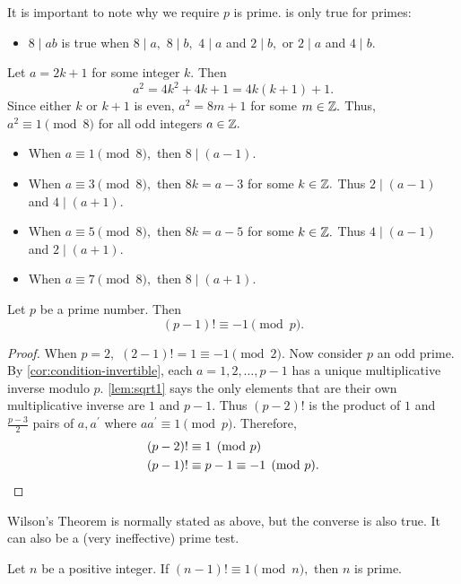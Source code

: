 \documentclass{ximera}
\begin{document}
\begin{remark}
    It is important to note why we require $p$ is prime.  is only true for primes: 
    \begin{itemize}
        \item $8\mid ab$ is true when $8\mid a,$ $8\mid b,$ $4\mid a$ and $2\mid b,$ or $2\mid a$ and $4\mid b.$
    \end{itemize}
    Let $a=2k+1$ for some integer $k.$ Then 
    \[a^2=4k^2+4k+1=4k(k+1)+1.\]
    Since either $k$ or $k+1$ is even, $a^2=8m+1$ for some $m\in\mathbb Z.$ Thus, $a^2\equiv 1\pmod 8$ for all odd integers $a\in\mathbb Z.$

    \begin{itemize}
        \item When $a\equiv 1\pmod 8,$ then $8\mid (a-1).$
        \item When $a\equiv 3\pmod 8,$ then $8k=a-3$ for some $k\in\mathbb Z.$ Thus $2\mid (a-1)$ and $4\mid (a+1)$.
        \item When $a\equiv 5\pmod 8,$ then $8k=a-5$ for some $k\in\mathbb Z.$ Thus $4\mid (a-1)$ and $2\mid (a+1)$.
        \item When $a\equiv 7\pmod 8,$ then $8\mid (a+1).$
    \end{itemize}
\end{remark}


\begin{theorem}\label{Wilson}
    Let $p$ be a prime number. Then \[(p-1)!\equiv -1\pmod{p}.\]
\end{theorem}

\begin{proof}
    When $p=2,$ $(2-1)!=1\equiv -1 \pmod{2}.$ Now consider $p$ an odd prime. By \cref{cor:condition-invertible}, each $a=1,2,\dots,p-1$ has a unique multiplicative inverse modulo $p.$ \cref{lem:sqrt1} says the only elements that are their own multiplicative inverse are $1$ and $p-1$. Thus $(p-2)!$ is the product of $1$ and $\frac{p-3}{2}$ pairs of $a,a^\prime$ where $a a^\prime\equiv 1\pmod{p}.$ Therefore, 
    \begin{align*}
        (p-2)! & \equiv 1\pmod{p}\\
        (p-1)! & \equiv p-1\equiv -1 \pmod{p}.\qedhere
    \end{align*}
\end{proof}

Wilson's Theorem is normally stated as above, but the converse is also true. It can also be a (very ineffective) prime test.
\begin{proposition}\label{Wilson-converse}
    Let $n$ be a positive integer. If $(n-1)!\equiv 1\pmod{n},$ then $n$ is prime.
\end{proposition}
\end{document}
